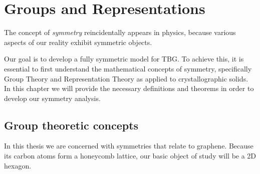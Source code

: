 


\chapter{Groups and Representations} \label{ch:group_theory}


The concept of \textit{symmetry} reincidentally appears in physics, because various aspects of our reality exhibit symmetric objects.

Our goal is to develop a fully symmetric model for TBG. To achieve this, it is essential to first understand the mathematical concepts of symmetry, specifically Group Theory and Representation Theory as applied to crystallographic solids. In this chapter we will provide the necessary definitions and theorems in order to develop our symmetry analysis.

\section{Group theoretic concepts} \label{sec:group_theoretic_concepts}

In this thesis we are concerned with symmetries that relate to graphene. Because its carbon atoms form a honeycomb lattice, our basic object of study will be a 2D hexagon.

